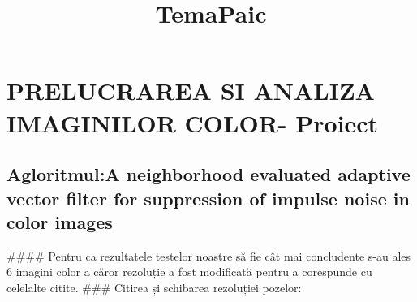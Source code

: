 \documentclass[11pt]{article}
\title{TemaPaic}
\begin{document}
    
    
    \maketitle
    
    

    
    \section{PRELUCRAREA SI ANALIZA IMAGINILOR COLOR-
Proiect}\label{prelucrarea-si-analiza-imaginilor-color--proiect}

\subsection{Agloritmul:A neighborhood evaluated adaptive vector filter
for suppression of impulse noise in color
images}\label{agloritmula-neighborhood-evaluated-adaptive-vector-filter-for-suppression-of-impulse-noise-in-color-images}

\#\#\#\# Pentru ca rezultatele testelor noastre să fie cât mai
concludente s-au ales 6 imagini color a căror rezoluție a fost
modificată pentru a corespunde cu celelalte citite. \#\#\# Citirea și
schibarea rezoluției pozelor:
\end{document}
